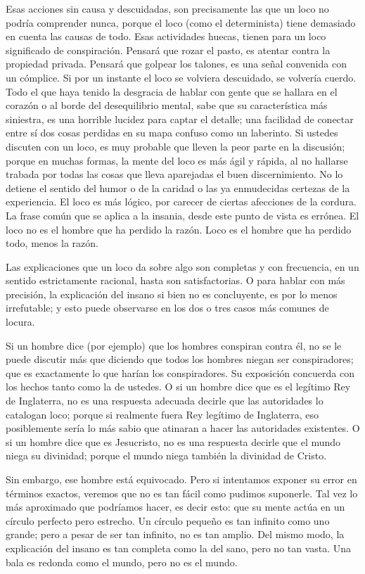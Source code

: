 Esas acciones sin causa y descuidadas, son precisamente las que un loco no podría comprender
nunca, porque el loco (como el determinista) tiene demasiado en cuenta las causas de todo. Esas
actividades huecas, tienen para un loco significado de conspiración. Pensará que rozar el pasto, es atentar
contra la propiedad privada. Pensará que golpear los talones, es una señal convenida con un cómplice. Si
por un instante el loco se volviera descuidado, se volvería cuerdo. Todo el que haya tenido la desgracia de
hablar con gente que se hallara en el corazón o al borde del desequilibrio mental, sabe que su
característica más siniestra, es una horrible lucidez para captar el detalle; una facilidad de conectar entre
sí dos cosas perdidas en su mapa confuso como un laberinto. Si ustedes discuten con un loco, es muy
probable que lleven la peor parte en la discusión; porque en muchas formas, la mente del loco es más ágil
y rápida, al no hallarse trabada por todas las cosas que lleva aparejadas el buen discernimiento. No lo
detiene el sentido del humor o de la caridad o las ya enmudecidas certezas de la experiencia. El loco es
más lógico, por carecer de ciertas afecciones de la cordura. La frase común que se aplica a la insania,
desde este punto de vista es errónea. El loco no es el hombre que ha perdido la razón. Loco es el hombre
que ha perdido todo, menos la razón.

Las explicaciones que un loco da sobre algo son completas y con frecuencia, en un sentido
estrictamente racional, hasta son satisfactorias.
O para hablar con más precisión, la explicación del insano si bien no es concluyente, es por lo
menos irrefutable; y esto puede observarse en los dos o tres casos más comunes de locura.

Si un hombre dice (por ejemplo) que los hombres conspiran contra él, no se le puede discutir más
que diciendo que todos los hombres niegan ser conspiradores; que es exactamente lo que harían los
conspiradores. Su exposición concuerda con los hechos tanto como la de ustedes. O si un hombre dice
que es el legítimo Rey de Inglaterra, no es una respuesta adecuada decirle que las autoridades lo catalogan
loco; porque si realmente fuera Rey legítimo de Inglaterra, eso posiblemente sería lo más sabio que
atinaran a hacer las autoridades existentes. O si un hombre dice que es Jesucristo, no es una respuesta
decirle que el mundo niega su divinidad; porque el mundo niega también la divinidad de Cristo.

Sin embargo, ese hombre está equivocado. Pero si intentamos exponer su error en términos exactos,
veremos que no es tan fácil como pudimos suponerle. Tal vez lo más aproximado que podríamos hacer, es
decir esto: que su mente actúa en un círculo perfecto pero estrecho. Un círculo pequeño es tan infinito
como uno grande; pero a pesar de ser tan infinito, no es tan amplio. Del mismo modo, la explicación del
insano es tan completa como la del sano, pero no tan vasta. Una bala es redonda como el mundo, pero no
es el mundo.

